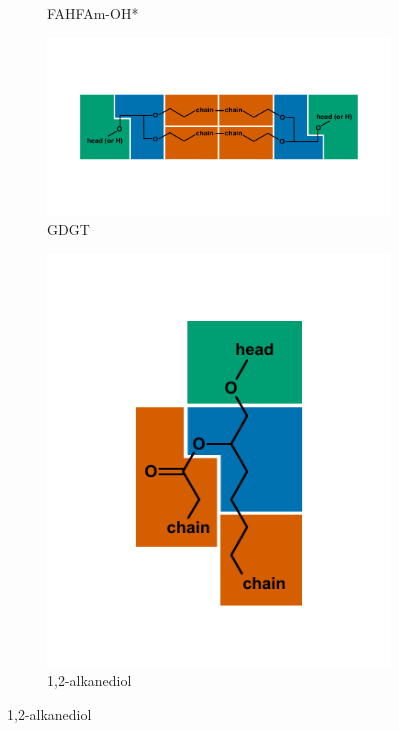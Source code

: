 \begin{figure}[h]
\begin{subfigure}[b]{.3\linewidth}
    	\caption{FAHFAm-OH*}
        \label{fig:FAHFAm-OH}
    \end{subfigure}
    \begin{subfigure}[b]{.6\linewidth}
        \includegraphics[width=\linewidth]{figs_ch1/GDGT}
    	\caption{GDGT}
        \label{fig:GDGT}
    \end{subfigure}
    \begin{subfigure}[b]{.3\linewidth}
    	\includegraphics[width=\linewidth]{figs_ch1/alkanediol}
    	\caption{1,2-alkanediol}
        \label{fig:diol}
    \end{subfigure}
\end{figure}
